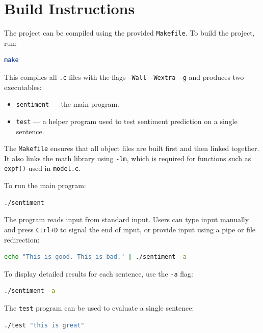 \documentclass[12pt]{article}
\begin{document}
\section{Build Instructions}

The project can be compiled using the provided \texttt{Makefile}. To build
the project, run:

\begin{lstlisting}[language=bash]
make
\end{lstlisting}

This compiles all \texttt{.c} files with the flags \texttt{-Wall -Wextra
-g} and produces two executables:

\begin{itemize}
  \item \texttt{sentiment} --- the main program.
  \item \texttt{test} --- a helper program used to test sentiment
        prediction on a single sentence.
\end{itemize}

The \texttt{Makefile} ensures that all object files are built first and
then linked together. It also links the math library using \texttt{-lm},
which is required for functions such as \texttt{expf()} used in
\texttt{model.c}.

To run the main program:

\begin{lstlisting}[language=bash]
./sentiment
\end{lstlisting}

The program reads input from standard input. Users can type input manually
and press \texttt{Ctrl+D} to signal the end of input, or provide input
using a pipe or file redirection:

\begin{lstlisting}[language=bash]
echo "This is good. This is bad." | ./sentiment -a
\end{lstlisting}

To display detailed results for each sentence, use the \texttt{-a} flag:

\begin{lstlisting}[language=bash]
./sentiment -a
\end{lstlisting}

The \texttt{test} program can be used to evaluate a single sentence:

\begin{lstlisting}[language=bash]
./test "this is great"
\end{lstlisting}
\end{document}
